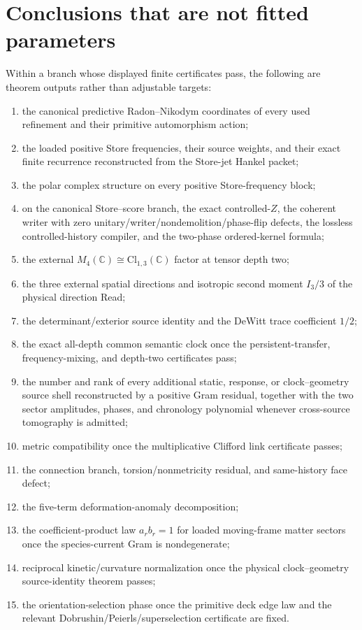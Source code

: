 \documentclass[11pt]{article}
\theoremstyle{definition}
\theoremstyle{remark}
\newcommand{\C}{\mathbb C}
\newcommand{\Cl}{\mathrm{Cl}}
\begin{document}
\section{Conclusions that are not fitted parameters}
\label{sec:not-fitted}

Within a branch whose displayed finite certificates pass, the following are
theorem outputs rather than adjustable targets:
\begin{enumerate}[label=\textup{(\arabic*)},leftmargin=2.7em]
\item the canonical predictive Radon--Nikodym coordinates of every used
      refinement and their primitive automorphism action;
\item the loaded positive Store frequencies, their source weights, and their
      exact finite recurrence reconstructed from the Store-jet Hankel packet;
\item the polar complex structure on every positive Store-frequency block;
\item on the canonical Store--score branch, the exact controlled-$Z$, the
      coherent writer with zero unitary/writer/nondemolition/phase-flip defects,
      the lossless controlled-history compiler, and the two-phase ordered-kernel
      formula;
\item the external $M_4(\C)\cong\Cl_{1,3}(\C)$ factor at tensor depth two;
\item the three external spatial directions and isotropic second moment
      $I_3/3$ of the physical direction Read;
\item the determinant/exterior source identity and the DeWitt trace coefficient
      $1/2$;
\item the exact all-depth common semantic clock once the persistent-transfer,
      frequency-mixing, and depth-two certificates pass;
\item the number and rank of every additional static, response, or
      clock--geometry source shell reconstructed by a positive Gram residual,
      together with the two sector amplitudes, phases, and chronology polynomial
      whenever cross-source tomography is admitted;
\item metric compatibility once the multiplicative Clifford link certificate
      passes;
\item the connection branch, torsion/nonmetricity residual, and same-history
      face defect;
\item the five-term deformation-anomaly decomposition;
\item the coefficient-product law $a_rb_r=1$ for loaded moving-frame matter sectors once the
      species-current Gram is nondegenerate;
\item reciprocal kinetic/curvature normalization once the physical
      clock--geometry source-identity theorem passes;
\item the orientation-selection phase once the primitive deck edge law and the
      relevant Dobrushin/Peierls/superselection certificate are fixed.
\end{enumerate}
\end{document}
